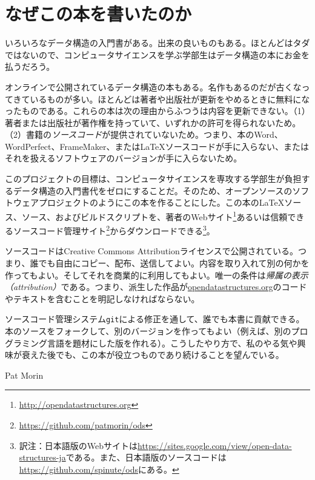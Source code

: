 \chapter*{なぜこの本を書いたのか}

いろいろなデータ構造の入門書がある。出来の良いものもある。ほとんどはタダではないので、コンピュータサイエンスを学ぶ学部生はデータ構造の本にお金を払うだろう。

オンラインで公開されているデータ構造の本もある。名作もあるのだが古くなってきているものが多い。ほとんどは著者や出版社が更新をやめるときに無料になったものである。これらの本は次の理由からふつうは内容を更新できない。（1）著者または出版社が著作権を持っていて、いずれかの許可を得られないため。（2）書籍の\emph{ソースコード}が提供されていないため。つまり、本のWord、WordPerfect、FrameMaker、または\LaTeX{}ソースコードが手に入らない、またはそれを扱えるソフトウェアのバージョンが手に入らないため。

このプロジェクトの目標は、コンピュータサイエンスを専攻する学部生が負担するデータ構造の入門書代をゼロにすることだ。そのため、オープンソースのソフトウェアプロジェクトのようにこの本を作ることにした。この本の\LaTeX{}ソース、\lang{}ソース、およびビルドスクリプトを、著者のWebサイト\footnote {\url{http://opendatastructures.org}}あるいは信頼できるソースコード管理サイト\footnote {\url{https://github.com/patmorin/ods}}からダウンロードできる\footnote {訳注：日本語版のWebサイトは\url{https://sites.google.com/view/open-data-structures-ja}である。また、日本語版のソースコードは\url{https://github.com/spinute/ods}にある。}。

ソースコードはCreative Commons Attributionライセンスで公開されている。つまり、誰でも自由にコピー、配布、送信してよい。内容を取り入れて別の何かを作ってもよい。そしてそれを商業的に利用してもよい。唯一の条件は\emph{帰属の表示（attribution）}である。つまり、派生した作品が\url{opendatastructures.org}のコードやテキストを含むことを明記しなければならない。

ソースコード管理システム\texttt{git}による修正を通して、誰でも本書に貢献できる。本のソースをフォークして、別のバージョンを作ってもよい（例えば、別のプログラミング言語を題材にした版を作れる）。こうしたやり方で、私のやる気や興味が衰えた後でも、この本が役立つものであり続けることを望んでいる。

\hfill Pat Morin
